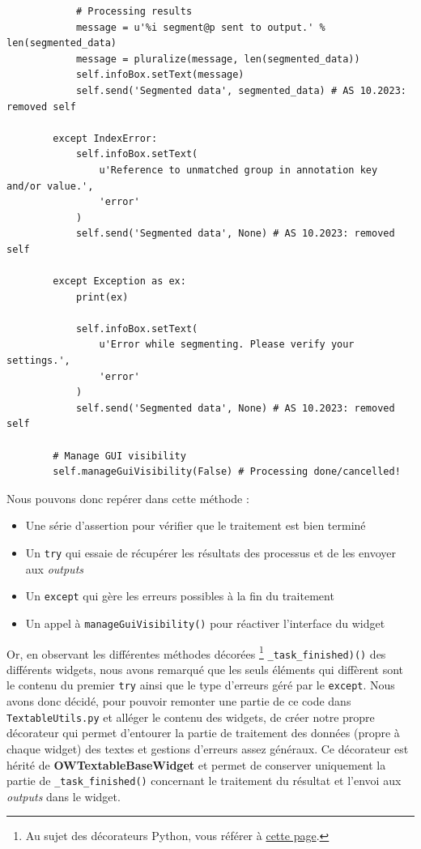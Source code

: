 \documentclass{article}
\begin{document}
{\begin{verbatim}
            # Processing results
            message = u'%i segment@p sent to output.' % len(segmented_data)
            message = pluralize(message, len(segmented_data))
            self.infoBox.setText(message)
            self.send('Segmented data', segmented_data) # AS 10.2023: removed self

        except IndexError:
            self.infoBox.setText(
                u'Reference to unmatched group in annotation key and/or value.',
                'error'
            )
            self.send('Segmented data', None) # AS 10.2023: removed self

        except Exception as ex:
            print(ex)
        
            self.infoBox.setText(
                u'Error while segmenting. Please verify your settings.',
                'error'
            )
            self.send('Segmented data', None) # AS 10.2023: removed self

        # Manage GUI visibility
        self.manageGuiVisibility(False) # Processing done/cancelled!
\end{verbatim}

Nous pouvons donc repérer dans cette méthode :
\begin{itemize}
    \item Une série d'assertion pour vérifier que le traitement est bien terminé
    \item Un \texttt{try} qui essaie de récupérer les résultats des processus et de les envoyer aux \textit{outputs}
    \item Un \texttt{except} qui gère les erreurs possibles à la fin du traitement
    \item Un appel à \texttt{manageGuiVisibility()} pour réactiver l'interface du widget
\end{itemize}

Or, en observant les différentes méthodes décorées \footnote{Au sujet des décorateurs Python, vous référer à \href{https://www.geeksforgeeks.org/decorators-in-python/}{cette page}.} \texttt{\_task\_finished)()} des différents widgets, nous avons remarqué que les seuls éléments qui diffèrent sont le contenu du premier \texttt{try} ainsi que le type d'erreurs géré par le \texttt{except}. Nous avons donc décidé, pour pouvoir remonter une partie de ce code dans \texttt{TextableUtils.py} et alléger le contenu des widgets, de créer notre propre décorateur qui permet d'entourer la partie de traitement des données (propre à chaque widget) des textes et gestions d'erreurs assez généraux. Ce décorateur est hérité de \textbf{OWTextableBaseWidget} et permet de conserver uniquement la partie de \texttt{\_task\_finished()} concernant le traitement du résultat et l'envoi aux \textit{outputs} dans le widget.

}
\end{document}
